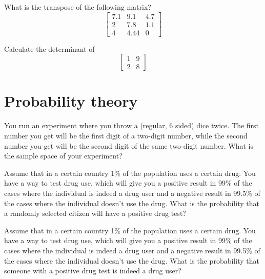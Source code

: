 \documentclass[10pt]{article}
\newenvironment{problem}[2][Problem]{\begin{trivlist}
\item[\hskip \labelsep {\bfseries #1}\hskip \labelsep {\bfseries #2.}]}{\end{trivlist}}
\begin{document}
\begin{problem}{4.3}
What is the transpose of the following matrix?
$$\begin{bmatrix}7.1 & 9.1 & 4.7\\ 2 & 7.8 & 1.1 \\ 4 & 4.44 & 0\end{bmatrix}$$
\end{problem}

\begin{problem}{4.4}
Calculate the determinant of
$$\begin{bmatrix}1 & 9 \\ 2 & 8 \end{bmatrix} $$
\end{problem}

\section{Probability theory}

\begin{problem}{5.1}
You run an experiment where you throw a (regular, 6 sided) dice twice. The first number you get will be the first digit of a two-digit number, while the second number you get will be the second digit of the same two-digit number. What is the sample space of your experiment?
\end{problem}

\begin{problem}{5.2}
Assume that in a certain country 1\% of the population uses a certain drug. You have a way to test drug use, which will give you a positive result in 99\% of the cases where the individual is indeed a drug user and a negative result in 99.5\% of the cases where the individual doesn't use the drug. What is the probability that a randomly selected citizen will have a positive drug test?
\end{problem}

\begin{problem}{5.3}
Assume that in a certain country 1\% of the population uses a certain drug. You have a way to test drug use, which will give you a positive result in 99\% of the cases where the individual is indeed a drug user and a negative result in 99.5\% of the cases where the individual doesn't use the drug. What is the probability that someone with a positive drug test is indeed a drug user?
\end{problem}
\end{document}
